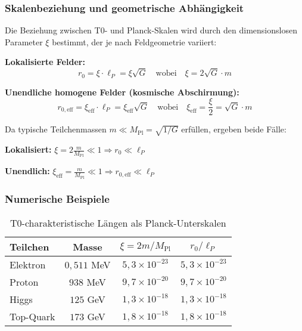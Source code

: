 \documentclass[12pt,a4paper]{article}
\begin{document}
\subsubsection{Skalenbeziehung und geometrische Abhängigkeit}
\label{subsubsec:scale_relationship}

Die Beziehung zwischen T0- und Planck-Skalen wird durch den dimensionslosen Parameter $\xi$ bestimmt, der je nach Feldgeometrie variiert:

\textbf{Lokalisierte Felder:}
\begin{equation}
	r_0 = \xi \cdot \ell_P = \xi \sqrt{G} \quad \text{wobei} \quad \xi = 2\sqrt{G} \cdot m
\end{equation}

\textbf{Unendliche homogene Felder (kosmische Abschirmung):}
\begin{equation}
	r_{0,\text{eff}} = \xi_{\text{eff}} \cdot \ell_P = \xi_{\text{eff}} \sqrt{G} \quad \text{wobei} \quad \xi_{\text{eff}} = \frac{\xi}{2} = \sqrt{G} \cdot m
\end{equation}

Da typische Teilchenmassen $m \ll M_{\text{Pl}} = \sqrt{1/G}$ erfüllen, ergeben beide Fälle:

\textbf{Lokalisiert:} $\xi = 2\frac{m}{M_{\text{Pl}}} \ll 1 \Rightarrow r_0 \ll \ell_P$

\textbf{Unendlich:} $\xi_{\text{eff}} = \frac{m}{M_{\text{Pl}}} \ll 1 \Rightarrow r_{0,\text{eff}} \ll \ell_P$

\subsubsection{Numerische Beispiele}
\label{subsubsec:numerical_examples}

\begin{table}[htbp]
	\centering
	\begin{tabular}{|l|c|c|c|}
		\hline
		\textbf{Teilchen} & \textbf{Masse} & \textbf{$\xi = 2m/M_{\text{Pl}}$} & \textbf{$r_0/\ell_P$} \\
		\hline
		Elektron & $0,511$ MeV & $5,3 \times 10^{-23}$ & $5,3 \times 10^{-23}$ \\
		Proton & $938$ MeV & $9,7 \times 10^{-20}$ & $9,7 \times 10^{-20}$ \\
		Higgs & $125$ GeV & $1,3 \times 10^{-18}$ & $1,3 \times 10^{-18}$ \\
		Top-Quark & $173$ GeV & $1,8 \times 10^{-18}$ & $1,8 \times 10^{-18}$ \\
		\hline
	\end{tabular}
	\caption{T0-charakteristische Längen als Planck-Unterskalen}
\end{table}
\end{document}
